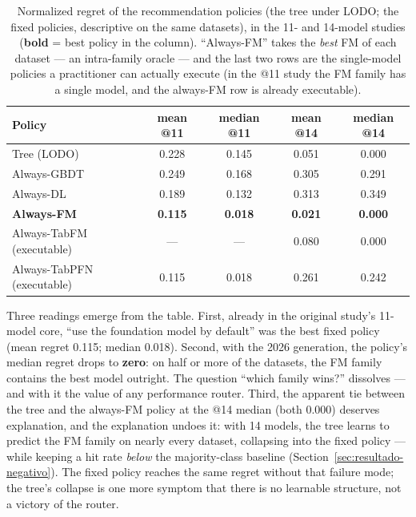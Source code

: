 \begin{table}[htb]
\centering
\caption[Regret of the recommendation policies]{Normalized regret of
the recommendation policies (the tree under LODO; the fixed
policies, descriptive on the same datasets), in the 11- and 14-model
studies (\textbf{bold} = best policy in the column). ``Always-FM''
takes the \emph{best} FM of each dataset --- an intra-family oracle
--- and the last two rows are the single-model policies a
practitioner can actually execute (in the @11 study the FM family
has a single model, and the always-FM row is already executable).}
\label{tab:regret-lodo}
\small
\begin{tabular}{lcccc}
\toprule
Policy & mean @11 & median @11 & mean @14 & median @14 \\
\midrule
Tree (LODO)        & 0.228 & 0.145 & 0.051 & 0.000 \\
Always-GBDT        & 0.249 & 0.168 & 0.305 & 0.291 \\
Always-DL          & 0.189 & 0.132 & 0.313 & 0.349 \\
\textbf{Always-FM} & \textbf{0.115} & \textbf{0.018} & \textbf{0.021} &
\textbf{0.000} \\
\midrule
Always-TabFM (executable)  & --- & --- & 0.080 & 0.000 \\
Always-TabPFN (executable) & 0.115 & 0.018 & 0.261 & 0.242 \\
\bottomrule
\end{tabular}
\end{table}

Three readings emerge from the table. First, already in the original
study's 11-model core, ``use the foundation model by default'' was
the best fixed policy (mean regret 0.115; median 0.018). Second,
with the 2026 generation, the policy's median regret drops to
\textbf{zero}: on half or more of the datasets, the FM family
contains the best model outright. The question ``which family
wins?'' dissolves --- and with it the value of any performance
router. Third, the apparent tie between the tree and the always-FM
policy at the @14 median (both 0.000) deserves explanation, and the
explanation undoes it: with 14 models, the tree learns to predict
the FM family on nearly every dataset, collapsing into the fixed
policy --- while keeping a hit rate \emph{below} the majority-class
baseline (Section~\ref{sec:resultado-negativo}). The fixed policy
reaches the same regret without that failure mode; the tree's
collapse is one more symptom that there is no learnable structure,
not a victory of the router.

